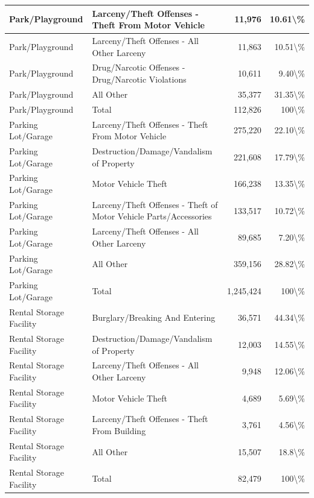 \documentclass[
]{krantz}
\begin{document}
\begin{longtable}[t]{l|l|r|r}
\hline
Park/Playground & Larceny/Theft Offenses - Theft From Motor Vehicle & 11,976 & 10.61\textbackslash{}\%\\
\hline
Park/Playground & Larceny/Theft Offenses - All Other Larceny & 11,863 & 10.51\textbackslash{}\%\\
\hline
Park/Playground & Drug/Narcotic Offenses - Drug/Narcotic Violations & 10,611 & 9.40\textbackslash{}\%\\
\hline
Park/Playground & All Other & 35,377 & 31.35\textbackslash{}\%\\
\hline
Park/Playground & Total & 112,826 & 100\textbackslash{}\%\\
\hline
Parking Lot/Garage & Larceny/Theft Offenses - Theft From Motor Vehicle & 275,220 & 22.10\textbackslash{}\%\\
\hline
Parking Lot/Garage & Destruction/Damage/Vandalism of Property & 221,608 & 17.79\textbackslash{}\%\\
\hline
Parking Lot/Garage & Motor Vehicle Theft & 166,238 & 13.35\textbackslash{}\%\\
\hline
Parking Lot/Garage & Larceny/Theft Offenses - Theft of Motor Vehicle Parts/Accessories & 133,517 & 10.72\textbackslash{}\%\\
\hline
Parking Lot/Garage & Larceny/Theft Offenses - All Other Larceny & 89,685 & 7.20\textbackslash{}\%\\
\hline
Parking Lot/Garage & All Other & 359,156 & 28.82\textbackslash{}\%\\
\hline
Parking Lot/Garage & Total & 1,245,424 & 100\textbackslash{}\%\\
\hline
Rental Storage Facility & Burglary/Breaking And Entering & 36,571 & 44.34\textbackslash{}\%\\
\hline
Rental Storage Facility & Destruction/Damage/Vandalism of Property & 12,003 & 14.55\textbackslash{}\%\\
\hline
Rental Storage Facility & Larceny/Theft Offenses - All Other Larceny & 9,948 & 12.06\textbackslash{}\%\\
\hline
Rental Storage Facility & Motor Vehicle Theft & 4,689 & 5.69\textbackslash{}\%\\
\hline
Rental Storage Facility & Larceny/Theft Offenses - Theft From Building & 3,761 & 4.56\textbackslash{}\%\\
\hline
Rental Storage Facility & All Other & 15,507 & 18.8\textbackslash{}\%\\
\hline
Rental Storage Facility & Total & 82,479 & 100\textbackslash{}\%\\

\end{longtable}
\end{document}
